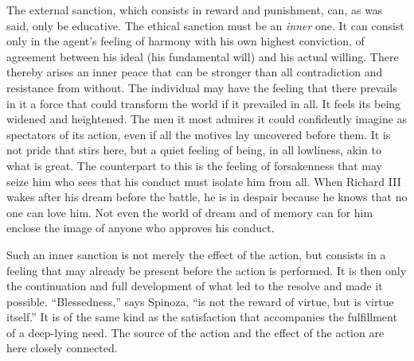 \documentclass[12pt,a4paper,openany]{book}
\begin{document}
The external sanction, which consists in reward and punishment, can, as was said, only be educative. The
ethical sanction must be an \textit{inner} one. It can consist only in the agent's feeling of harmony with
his own highest conviction, of agreement between his ideal (his fundamental will) and his actual willing.
There thereby arises an inner peace that can be stronger than all contradiction and resistance from
without. The individual may have the feeling that there prevails in it a force that could transform the
world if it prevailed in all. It feels its being widened and heightened. The men it most admires it could
confidently imagine as spectators of its action, even if all the motives lay uncovered before them. It
is not pride that stirs here, but a quiet feeling of being, in all lowliness, akin to what is great. The
counterpart to this is the feeling of forsakenness that may seize him who sees that his conduct must
isolate him from all. When Richard III wakes after his dream before the battle, he is in despair because
he knows that no one can love him. Not even the world of dream and of memory can for him enclose the
image of anyone who approves his conduct.

Such an inner sanction is not merely the effect of the action, but consists in a feeling that may already
be present before the action is performed. It is then only the continuation and full development of what
led to the resolve and made it possible. ``Blessedness,'' says Spinoza, ``is not the reward of virtue, but
is virtue itself.'' It is of the same kind as the satisfaction that accompanies the fulfillment of a
deep-lying need. The source of the action and the effect of the action are here closely connected.
\end{document}
